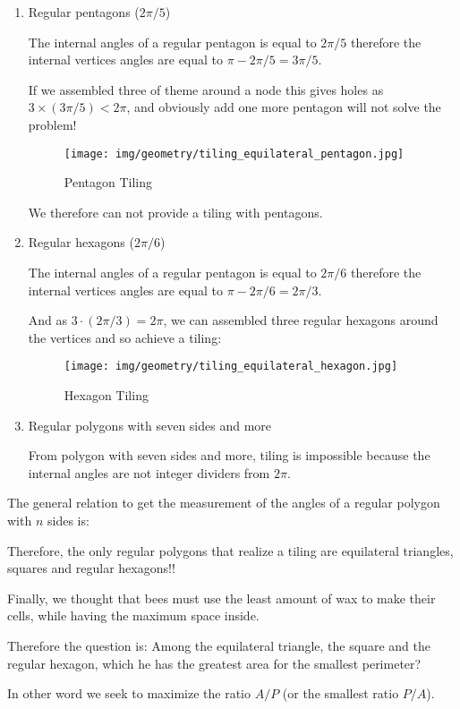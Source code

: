 {\begin{enumerate}
		\item Regular pentagons ($2\pi/5$)
		
		The internal angles of a regular pentagon is equal to $2\pi/5$ therefore the internal vertices angles are equal to $\pi-2\pi/5=3\pi/5$.
		
		If we assembled three of theme around a node this gives holes as $3\times (3\pi/5)<2\pi$, and obviously add one more pentagon will not solve the problem!
		\begin{figure}[H]
			\centering
			\texttt{[image: img/geometry/tiling\_equilateral\_pentagon.jpg]}
			\caption[]{Pentagon Tiling}
		\end{figure}
		We therefore can not provide a tiling with pentagons.
		
		\item Regular hexagons ($2\pi/6$)
		
		The internal angles of a regular pentagon is equal to $2\pi/6$ therefore the internal vertices angles are equal to $\pi-2\pi/6=2\pi/3$.
		
		And as $3\cdot (2\pi/3)=2\pi$, we can assembled three regular hexagons around the vertices and so achieve a tiling:
		\begin{figure}[H]
			\centering
			\texttt{[image: img/geometry/tiling\_equilateral\_hexagon.jpg]}
			\caption[]{Hexagon Tiling}
		\end{figure}
		
		\item Regular polygons with seven sides and more
		
		From polygon with seven sides and more, tiling is impossible because the internal angles are not integer dividers from $2\pi$.
	\end{enumerate}
	
	The general relation to get the measurement of the angles of a regular polygon with $n$ sides is:
	
	Therefore, the only regular polygons that realize a tiling are equilateral triangles, squares and regular hexagons!!
	
	Finally, we thought that bees must use the least amount of wax to make their cells, while having the maximum space inside.
	
	Therefore the question is: Among the equilateral triangle, the square and the regular hexagon, which he has the greatest area for the smallest perimeter?
	
	In other word we seek to maximize the ratio $A/P$ (or the smallest ratio $P/A$).
	
}
